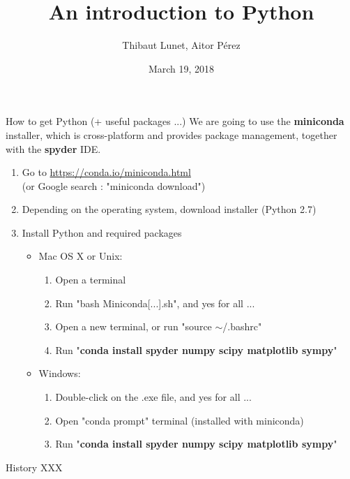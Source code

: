 \documentclass[11pt,unknownkeysallowed,usenames,dvipsnames]{beamer}
\title{An introduction to Python}
\author{Thibaut Lunet, Aitor Pérez}
\date{March 19, 2018}
\begin{document}
	\maketitle
	
   	\begin{frame}{How to get Python (+ useful packages ...)}
        We are going to use the \textbf{miniconda} installer, which is cross-platform and provides package management, together with the \textbf{spyder} IDE.
        
        \begin{enumerate}
            \item Go to \href{https://conda.io/miniconda.html}{https://conda.io/miniconda.html} \\ (or Google search : "miniconda download")
            \item Depending on the operating system, download installer (Python 2.7)
            \item Install Python and required packages
            \begin{itemize}
                \item Mac OS X or Unix:
                \begin{enumerate}
                    \item Open a terminal
                    \item Run "bash Miniconda[...].sh", and yes for all ...
                    \item Open a new terminal, or run "source $\sim$/.bashrc"
                    \item Run "\textbf{conda install spyder numpy scipy matplotlib sympy}"
                \end{enumerate}
                \item Windows:
                \begin{enumerate}
                    \item Double-click on the .exe file, and yes for all ...
                    \item Open "conda prompt" terminal (installed with miniconda)
                    \item Run "\textbf{conda install spyder numpy scipy matplotlib sympy}"
                \end{enumerate}
            \end{itemize}
        \end{enumerate}
    \end{frame}
    
	\begin{frame}{History}
		XXX
	\end{frame}
\end{document}
